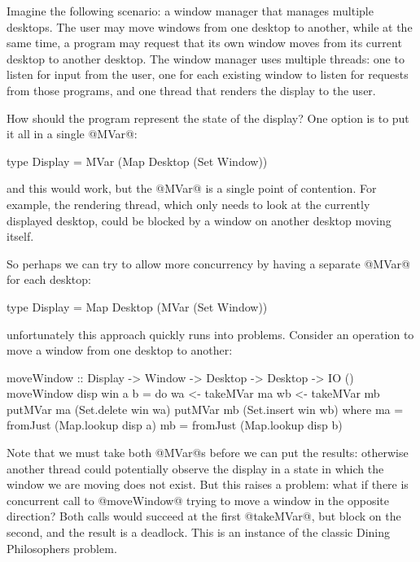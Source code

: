 Imagine the following scenario: a window manager that manages multiple
desktops.  The user may move windows from one desktop to another,
while at the same time, a program may request that its own window
moves from its current desktop to another desktop.  The window manager
uses multiple threads: one to listen for input from the user, one for
each existing window to listen for requests from those programs, and
one thread that renders the display to the user.

How should the program represent the state of the display?  One option
is to put it all in a single @MVar@:

\begin{haskell}
type Display = MVar (Map Desktop (Set Window))
\end{haskell}

\noindent and this would work, but the @MVar@ is a single point of
contention.  For example, the rendering thread, which only needs to
look at the currently displayed desktop, could be blocked by a window
on another desktop moving itself.

So perhaps we can try to allow more concurrency by having a separate
@MVar@ for each desktop:

\begin{haskell}
type Display = Map Desktop (MVar (Set Window))
\end{haskell}

\noindent unfortunately this approach quickly runs into problems.
Consider an operation to move a window from one desktop to another:

\begin{haskell}
moveWindow :: Display -> Window -> Desktop -> Desktop -> IO ()
moveWindow disp win a b = do
  wa <- takeMVar ma
  wb <- takeMVar mb
  putMVar ma (Set.delete win wa)
  putMVar mb (Set.insert win wb)
 where
  ma = fromJust (Map.lookup disp a)
  mb = fromJust (Map.lookup disp b)
\end{haskell}

\noindent Note that we must take both @MVar@s before we can put the
results: otherwise another thread could potentially observe the
display in a state in which the window we are moving does not exist.
But this raises a problem: what if there is concurrent call to
@moveWindow@ trying to move a window in the opposite direction?  Both
calls would succeed at the first @takeMVar@, but block on the second,
and the result is a deadlock.  This is an instance of the classic
Dining Philosophers problem. %

